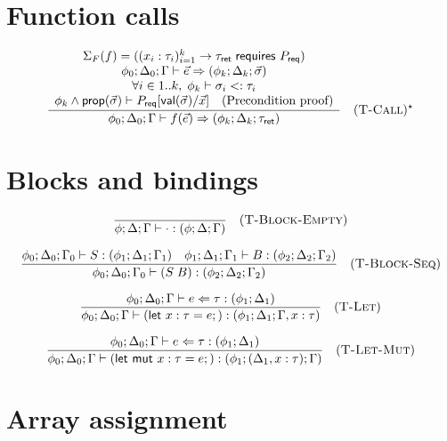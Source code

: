 \section*{Function calls}

$$
  \frac{
    \begin{array}{c}
      \Sigma_F(f) = ( (x_i:\tau_i)_{i=1}^k \rightarrow \tau_\textsf{ret}\; \textsf{requires } P_\textsf{req} ) \\
      \phi_0; \Delta_0; \Gamma \vdash \vec{e} \Rightarrow (\phi_k; \Delta_k; \vec{\sigma})                     \\
      \forall i \in 1..k,\; \phi_k \vdash \sigma_i <: \tau_i                                                   \\
      \phi_k \wedge \textsf{prop}(\vec{\sigma}) \vdash P_\textsf{req}[\textsf{val}(\vec{\sigma}) / \vec{x}] \quad \text{(Precondition proof)}
    \end{array}
  }{
    \phi_0; \Delta_0; \Gamma \vdash f(\vec{e}) \Rightarrow (\phi_k; \Delta_k; \tau_\textsf{ret})
  } \quad (\textsc{T-Call})^\star
$$

\section*{Blocks and bindings}

$$
  \frac{}{\phi; \Delta; \Gamma \vdash \cdot : (\phi; \Delta; \Gamma)} \quad (\textsc{T-Block-Empty})
$$

$$
  \frac{
    \phi_0; \Delta_0; \Gamma_0 \vdash S : (\phi_1; \Delta_1; \Gamma_1) \quad \phi_1; \Delta_1; \Gamma_1 \vdash B : (\phi_2; \Delta_2; \Gamma_2)
  }{
    \phi_0; \Delta_0; \Gamma_0 \vdash (S\; B) : (\phi_2; \Delta_2; \Gamma_2)
  } \quad (\textsc{T-Block-Seq})
$$

$$\frac{\phi_0; \Delta_0; \Gamma \vdash e \Leftarrow \tau : (\phi_1; \Delta_1)}{\phi_0; \Delta_0; \Gamma \vdash (\textsf{let } x:\tau = e;) : (\phi_1; \Delta_1; \Gamma, x:\tau)} \quad (\textsc{T-Let})$$

$$\frac{\phi_0; \Delta_0; \Gamma \vdash e \Leftarrow \tau : (\phi_1; \Delta_1)}{\phi_0; \Delta_0; \Gamma \vdash (\textsf{let mut } x:\tau = e;) : (\phi_1; (\Delta_1, x:\tau); \Gamma)} \quad (\textsc{T-Let-Mut})$$

\section*{Array assignment}


